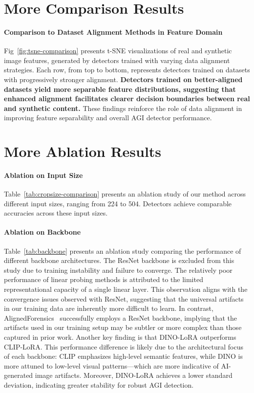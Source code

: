 \documentclass{article}
\begin{document}
\section{More Comparison Results}
\label{sec:comparison}

\paragraph{Comparison to Dataset Alignment Methods in Feature Domain}
Fig~\ref{fig:tsne-comparison} presents t-SNE visualizations of real and synthetic image features, generated by detectors trained with varying data alignment strategies. Each row, from top to bottom, represents detectors trained on datasets with progressively stronger alignment. \textbf{Detectors trained on better-aligned datasets yield more separable feature distributions, suggesting that enhanced alignment facilitates clearer decision boundaries between real and synthetic content.} These findings reinforce the role of data alignment in improving feature separability and overall AGI detector performance.

\section{More Ablation Results} 
\label{sec:ablation}

\paragraph{Ablation on Input Size} Table~\ref{tab:cropsize-comparison} presents an ablation study of our method across different input sizes, ranging from 224 to 504. Detectors achieve comparable accuracies across these input sizes.


\paragraph{Ablation on Backbone} 
Table~\ref{tab:backbone} presents an ablation study comparing the performance of different backbone architectures. The ResNet backbone is excluded from this study due to training instability and failure to converge. The relatively poor performance of linear probing methods is attributed to the limited representational capacity of a single linear layer. This observation aligns with the convergence issues observed with ResNet, suggesting that the universal artifacts in our training data are inherently more difficult to learn.
In contrast, AlignedForensics~\cite{rajan2025aligned} successfully employs a ResNet backbone, implying that the artifacts used in our training setup may be subtler or more complex than those captured in prior work. Another key finding is that DINO-LoRA outperforms CLIP-LoRA. This performance difference is likely due to the architectural focus of each backbone: CLIP emphasizes high-level semantic features, while DINO is more attuned to low-level visual patterns—which are more indicative of AI-generated image artifacts. Moreover, DINO-LoRA achieves a lower standard deviation, indicating greater stability for robust AGI detection.
\end{document}
